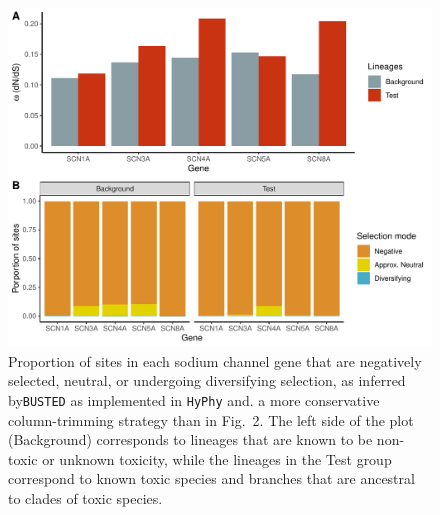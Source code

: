 \documentclass{article}
\begin{document}
\begin{figure}[h!]
    \centering
    \includegraphics[width=\textwidth]{figures/FigS6_selection.pdf}
    \caption{Proportion of sites in each sodium channel gene that are negatively selected, neutral, or undergoing diversifying selection, as inferred by\texttt{BUSTED} as implemented in \texttt{HyPhy} and. a more conservative column-trimming strategy than in Fig.~2. The left side of the plot (Background) corresponds to lineages that are known to be non-toxic or unknown toxicity, while the lineages in the Test group correspond to known toxic species and branches that are ancestral to clades of toxic species.}
    \label{fig:my_label}
\end{figure}
\clearpage





\end{document}
